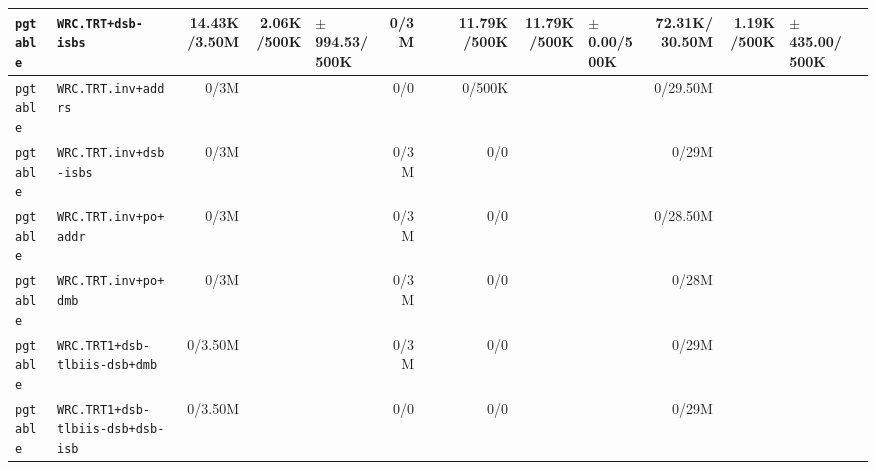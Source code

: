 \begin{tabular}{l l  | r r l | r r l | r r l | r r l l}
     \verb|pgtable| &                                    \verb|WRC.TRT+dsb-isbs| &   14.43K/3.50M &            2.06K/500K & $\pm$ 994.53/500K &           0/3M &                       &                 &    11.79K/500K &           11.79K/500K &   $\pm$ 0.00/500K &  72.31K/30.50M &            1.19K/500K & $\pm$ 435.00/500K & \\ \hline 
     \verb|pgtable| &                                   \verb|WRC.TRT.inv+addrs| &           0/3M &                       &                   &            0/0 &                       &                 &         0/500K &                       &                   &       0/29.50M &                       &                   & \\ \hline 
     \verb|pgtable| &                                \verb|WRC.TRT.inv+dsb-isbs| &           0/3M &                       &                   &           0/3M &                       &                 &            0/0 &                       &                   &          0/29M &                       &                   & \\ \hline 
     \verb|pgtable| &                                 \verb|WRC.TRT.inv+po+addr| &           0/3M &                       &                   &           0/3M &                       &                 &            0/0 &                       &                   &       0/28.50M &                       &                   & \\ \hline 
     \verb|pgtable| &                                  \verb|WRC.TRT.inv+po+dmb| &           0/3M &                       &                   &           0/3M &                       &                 &            0/0 &                       &                   &          0/28M &                       &                   & \\ \hline 
     \verb|pgtable| &                         \verb|WRC.TRT1+dsb-tlbiis-dsb+dmb| &        0/3.50M &                       &                   &           0/3M &                       &                 &            0/0 &                       &                   &          0/29M &                       &                   & \\ \hline 
     \verb|pgtable| &                     \verb|WRC.TRT1+dsb-tlbiis-dsb+dsb-isb| &        0/3.50M &                       &                   &            0/0 &                       &                 &            0/0 &                       &                   &          0/29M &                       &                   & \\ \hline 

\end{tabular}
